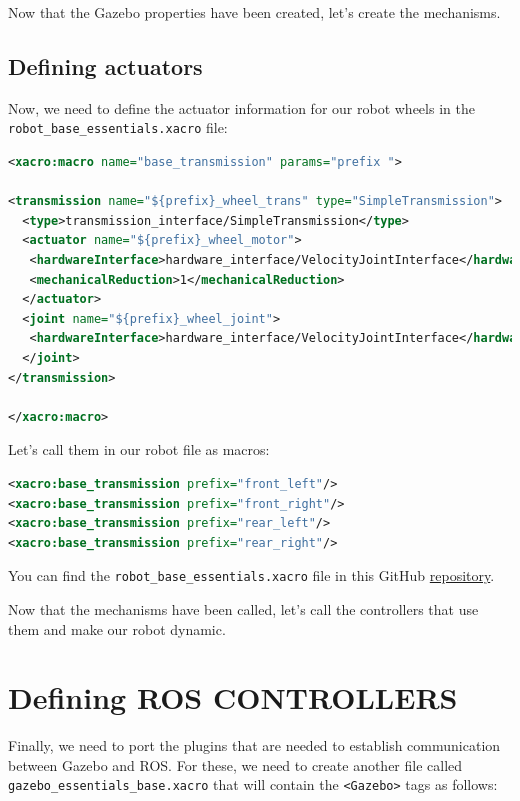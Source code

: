 \documentclass[letterpaper,pdftex]{article}
\begin{document}
Now that the Gazebo properties have been created, let's create the mechanisms.

\subsection{Defining actuators}

Now, we need to define the actuator information for our robot wheels in the \verb|robot_base_essentials.xacro| file:

\begin{lstlisting}[language=xml]
<xacro:macro name="base_transmission" params="prefix ">

<transmission name="${prefix}_wheel_trans" type="SimpleTransmission">
  <type>transmission_interface/SimpleTransmission</type>
  <actuator name="${prefix}_wheel_motor">
   <hardwareInterface>hardware_interface/VelocityJointInterface</hardwareInterface>
   <mechanicalReduction>1</mechanicalReduction>
  </actuator>
  <joint name="${prefix}_wheel_joint">
   <hardwareInterface>hardware_interface/VelocityJointInterface</hardwareInterface>
  </joint>
</transmission>

</xacro:macro>
\end{lstlisting}

Let's call them in our robot file as macros:

\begin{lstlisting}[language=xml]
<xacro:base_transmission prefix="front_left"/>
<xacro:base_transmission prefix="front_right"/>
<xacro:base_transmission prefix="rear_left"/>
<xacro:base_transmission prefix="rear_right"/>
\end{lstlisting}

You can find the \verb|robot_base_essentials.xacro| file in this GitHub \href{https://github.com/nikorose87/robotics_labs/tree/main/Lab2/Resources/urdf}{repository}.

Now that the mechanisms have been called, let's call the controllers that use them and make our robot dynamic.

\section{Defining ROS CONTROLLERS}

Finally, we need to port the plugins that are needed to establish communication between Gazebo and ROS. For these, we need to create another file called \verb|gazebo_essentials_base.xacro| that will contain the \verb|<Gazebo>| tags as follows:
\end{document}

